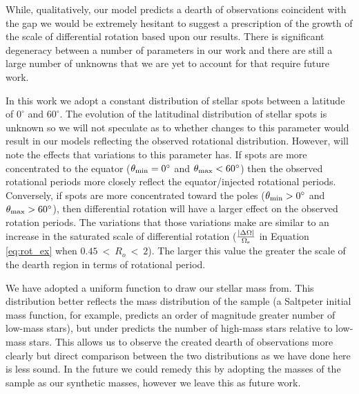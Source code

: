 While, qualitatively, our model predicts a dearth of observations coincident with the gap we would be extremely hesitant to suggest a prescription of the growth of the scale of differential rotation based upon our results.
There is significant degeneracy between a number of parameters in our work and there are still a large number of unknowns that we are yet to account for that require future work.

In this work we adopt a constant distribution of stellar spots between a latitude of $0^{\circ}$ and $60^{\circ}$.
The evolution of the latitudinal distribution of stellar spots is unknown so we will not speculate as to whether changes to this parameter would result in our models reflecting the observed rotational distribution.
However, will note the effects that variations to this parameter has.
If spots are more concentrated to the equator ($\theta_{\rm{min}} = 0^{\circ}$ and $\theta_{\rm{max}} < 60^{\circ}$) then the observed rotational periods more closely reflect the equator/injected rotational periods.
Conversely, if spots are more concentrated toward the poles ($\theta_{\rm{min}} > 0^{\circ}$ and $\theta_{\rm{max}} > 60^{\circ}$), then differential rotation will have a larger effect on the observed rotation periods.
The variations that those variations make are similar to an increase in the saturated scale of differential rotation ($\frac{|\Delta\Omega|}{\Omega_{\rm{s}}}$ in Equation \ref{eq:rot_ex} when $0.45 \ < \ R_o \ < \ 2$).
The larger this value the greater the scale of the dearth region in terms of rotational period.

We have adopted a uniform function to draw our stellar mass from.
This distribution better reflects the mass distribution of the \citet{mcquillan_rotation_2014} sample (a Saltpeter initial mass function, for example, predicts an order of magnitude greater number of low-mass stars), but under predicts the number of high-mass stars relative to low-mass stars.
This allows us to observe the created dearth of observations more clearly but direct comparison between the two distributions as we have done here is less sound.
In the future we could remedy this by adopting the masses of the \citet{mcquillan_rotation_2014} sample as our synthetic masses, however we leave this as future work.

